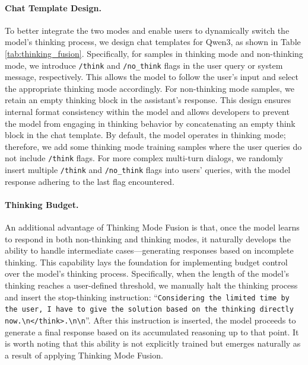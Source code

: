 \paragraph{Chat Template Design.} To better integrate the two modes and enable users to dynamically switch the model's thinking process, we design chat templates for Qwen3, as shown in Table \ref{tab:thinking_fusion}. Specifically, for samples in thinking mode and non-thinking mode, we introduce \texttt{/think} and \texttt{/no\_think} flags in the user query or system message, respectively. This allows the model to follow the user's input and select the appropriate thinking mode accordingly.
For non-thinking mode samples, we retain an empty thinking block in the assistant's response. This design ensures internal format consistency within the model and allows developers to prevent the model from engaging in thinking behavior by concatenating an empty think block in the chat template. 
By default, the model operates in thinking mode; therefore, we add some thinking mode training samples where the user queries do not include \texttt{/think} flags. For more complex multi-turn dialogs, we randomly insert multiple \texttt{/think} and \texttt{/no\_think} flags into users' queries, with the model response adhering to the last flag encountered.



\paragraph{Thinking Budget.} An additional advantage of Thinking Mode Fusion is that, once the model learns to respond in both non-thinking and thinking modes, it naturally develops the ability to handle intermediate cases—generating responses based on incomplete thinking.
This capability lays the foundation for implementing budget control over the model's thinking process. Specifically, when the length of the model's thinking reaches a user-defined threshold, we manually halt the thinking process and insert the stop-thinking instruction: ``\texttt{{Considering the limited time by the user, I have to give the solution based on the thinking directly now.\textbackslash n</think>.\textbackslash n\textbackslash n}}''. 
After this instruction is inserted, the model proceeds to generate a final response based on its accumulated reasoning up to that point. It is worth noting that this ability is not explicitly trained but emerges naturally as a result of applying Thinking Mode Fusion. 


